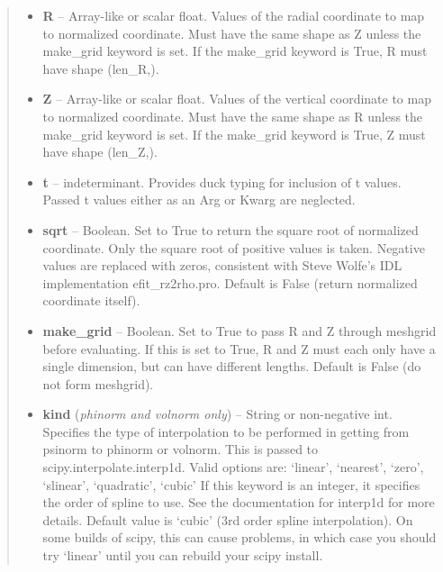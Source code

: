 \documentclass[letterpaper,10pt,english]{sphinxmanual}
\begin{document}
\begin{fulllineitems}
\begin{fulllineitems}
\begin{quote}
\begin{description}
\begin{itemize}
\begin{quote}
\begin{tabulary}{\linewidth}{|L|L|}
volnorm
 & 
Normalized volume
\\
\hline\end{tabulary}

\end{quote}

\item {} 
\textbf{R} --
Array-like or scalar float.
Values of the radial coordinate to
map to normalized coordinate. Must have the same shape as Z
unless the make\_grid keyword is set. If the make\_grid keyword
is True, R must have shape (len\_R,).

\item {} 
\textbf{Z} --
Array-like or scalar float.
Values of the vertical coordinate to
map to normalized coordinate. Must have the same shape as R
unless the make\_grid keyword is set. If the make\_grid keyword
is True, Z must have shape (len\_Z,).

\end{itemize}

\item[{Keyword Arguments}] \leavevmode\begin{itemize}
\item {} 
\textbf{t} --
indeterminant.
Provides duck typing for inclusion of t values. Passed t values
either as an Arg or Kwarg are neglected.

\item {} 
\textbf{sqrt} --
Boolean.
Set to True to return the square root of normalized
coordinate. Only the square root of positive values is taken.
Negative values are replaced with zeros, consistent with Steve
Wolfe's IDL implementation efit\_rz2rho.pro. Default is False
(return normalized coordinate itself).

\item {} 
\textbf{make\_grid} --
Boolean.
Set to True to pass R and Z through meshgrid
before evaluating. If this is set to True, R and Z must each
only have a single dimension, but can have different lengths.
Default is False (do not form meshgrid).

\item {} 
\textbf{kind} (\emph{phinorm and volnorm only}) --
String or non-negative int.
Specifies the type of interpolation to be performed in getting
from psinorm to phinorm or volnorm. This is passed to
scipy.interpolate.interp1d. Valid options are:
`linear', `nearest', `zero', `slinear', `quadratic', `cubic'
If this keyword is an integer, it specifies the order of spline
to use. See the documentation for interp1d for more details.
Default value is `cubic' (3rd order spline interpolation). On
some builds of scipy, this can cause problems, in which case
you should try `linear' until you can rebuild your scipy install.


\end{itemize}
\end{description}
\end{quote}
\end{fulllineitems}
\end{fulllineitems}
\end{document}
